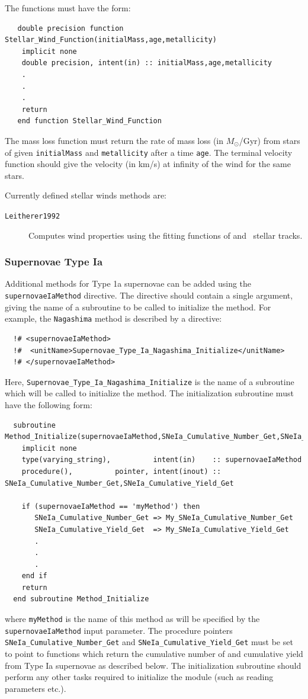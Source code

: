 The functions must have the form:
\begin{verbatim}
   double precision function Stellar_Wind_Function(initialMass,age,metallicity)
    implicit none
    double precision, intent(in) :: initialMass,age,metallicity
    .
    .
    .
    return
   end function Stellar_Wind_Function 
\end{verbatim}
The mass loss function must return the rate of mass loss (in $M_\odot$/Gyr) from stars of given {\tt initialMass} and {\tt metallicity} after a time {\tt age}. The terminal velocity function should give the velocity (in km/s) at infinity of the wind for the same stars.

Currently defined stellar winds methods are:
\begin{description}
 \item [{\tt Leitherer1992}] Computes wind properties using the fitting functions of \cite{leitherer_deposition_1992} and \glc\ stellar tracks.
\end{description}

\subsubsection{Supernovae Type Ia}

Additional methods for Type 1a supernovae can be added using the {\tt supernovaeIaMethod} directive. The directive should contain a single argument, giving the name of a subroutine to be called to initialize the method. For example, the {\tt Nagashima} method is described by a directive:
\begin{verbatim}
  !# <supernovaeIaMethod>
  !#  <unitName>Supernovae_Type_Ia_Nagashima_Initialize</unitName>
  !# </supernovaeIaMethod>
\end{verbatim}
Here, {\tt Supernovae\_Type\_Ia\_Nagashima\_Initialize} is the name of a subroutine which will be called to initialize the method. The initialization subroutine must have the following form:
\begin{verbatim}
  subroutine Method_Initialize(supernovaeIaMethod,SNeIa_Cumulative_Number_Get,SNeIa_Cumulative_Yield_Get)
    implicit none
    type(varying_string),          intent(in)    :: supernovaeIaMethod
    procedure(),          pointer, intent(inout) :: SNeIa_Cumulative_Number_Get,SNeIa_Cumulative_Yield_Get
    
    if (supernovaeIaMethod == 'myMethod') then
       SNeIa_Cumulative_Number_Get => My_SNeIa_Cumulative_Number_Get
       SNeIa_Cumulative_Yield_Get  => My_SNeIa_Cumulative_Yield_Get
       .
       .
       .
    end if
    return
  end subroutine Method_Initialize
\end{verbatim}
where {\tt myMethod} is the name of this method as will be specified by the {\tt supernovaeIaMethod} input parameter. The procedure pointers {\tt SNeIa\_Cumulative\_Number\_Get} and {\tt SNeIa\_Cumulative\_Yield\_Get} must be set to point to functions which return the cumulative number of and cumulative yield from Type Ia supernovae as described below. The initialization subroutine should perform any other tasks required to initialize the module (such as reading parameters etc.).

